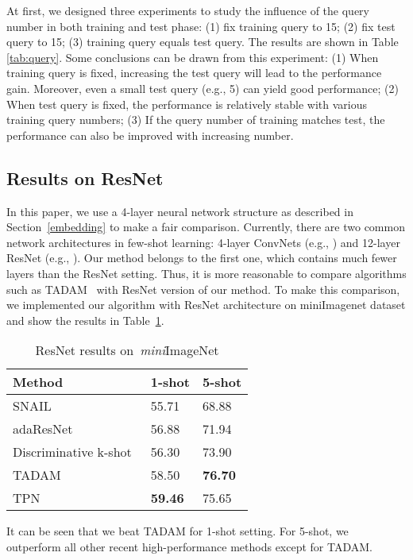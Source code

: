 \documentclass{article} \usepackage{iclr2019_conference,times}
\def\mini{{\textit{mini}ImageNet}}
\begin{document}
At first, we designed three experiments to study the influence of the query number in both training and test phase: (1) fix training query to 15; (2) fix test query to 15; (3) training query equals test query. The results are shown in Table \ref{tab:query}. Some conclusions can be drawn from this experiment: (1) When training query is fixed, increasing the test query will lead to the performance gain. Moreover, even a small test query (e.g., 5) can yield good performance; (2) When test query is fixed, the performance is relatively stable with various training query numbers; (3) If the query number of training matches test, the performance can also be improved with increasing number. 


\subsection{Results on ResNet}
In this paper, we use a 4-layer neural network structure as described in Section~\ref{embedding} to make a fair comparison. 
Currently, there are two common network architectures in few-shot learning: 4-layer ConvNets (e.g., \cite{maml,prototypical,compare}) and 12-layer ResNet (e.g., \cite{snail,rapid,discriminative,tadam}). Our method belongs to the first one, which contains much fewer layers than the ResNet setting. Thus, it is more reasonable to compare algorithms such as TADAM~\citep{tadam} with ResNet version of our method. To make this comparison, we implemented our algorithm with ResNet architecture on miniImagenet dataset and show the results in Table~\ref{tab:resnet}.

\begin{table}[ht]
\centering
\small
\caption{ResNet results on~\mini}
\begin{tabular}{l|ll}
\hline
Method & 1-shot & 5-shot    \\
\hline
SNAIL~\citep{snail}        & 55.71 & 68.88  \\
adaResNet~\citep{rapid}    & 56.88 & 71.94  \\
Discriminative k-shot~\citep{discriminative} & 56.30 & 73.90  \\ 
TADAM~\citep{tadam}        & 58.50 & \textbf{76.70} \\
\hline
TPN                        & \textbf{59.46} & 75.65 \\
\end{tabular}
\label{tab:resnet}
\end{table}

It can be seen that we beat TADAM for 1-shot setting. For 5-shot, we outperform all other recent high-performance methods except for TADAM. 
\end{document}
